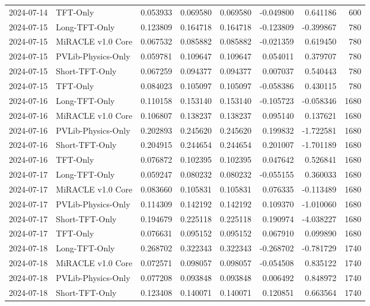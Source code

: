\begin{tabular}{llrrrrrr}
2024-07-14 & TFT-Only & 0.053933 & 0.069580 & 0.069580 & -0.049800 & 0.641186 & 600 \\
2024-07-15 & Long-TFT-Only & 0.123809 & 0.164718 & 0.164718 & -0.123809 & -0.399867 & 780 \\
2024-07-15 & MiRACLE v1.0 Core & 0.067532 & 0.085882 & 0.085882 & -0.021359 & 0.619450 & 780 \\
2024-07-15 & PVLib-Physics-Only & 0.059781 & 0.109647 & 0.109647 & 0.054011 & 0.379707 & 780 \\
2024-07-15 & Short-TFT-Only & 0.067259 & 0.094377 & 0.094377 & 0.007037 & 0.540443 & 780 \\
2024-07-15 & TFT-Only & 0.084023 & 0.105097 & 0.105097 & -0.058386 & 0.430115 & 780 \\
2024-07-16 & Long-TFT-Only & 0.110158 & 0.153140 & 0.153140 & -0.105723 & -0.058346 & 1680 \\
2024-07-16 & MiRACLE v1.0 Core & 0.106807 & 0.138237 & 0.138237 & 0.095140 & 0.137621 & 1680 \\
2024-07-16 & PVLib-Physics-Only & 0.202893 & 0.245620 & 0.245620 & 0.199832 & -1.722581 & 1680 \\
2024-07-16 & Short-TFT-Only & 0.204915 & 0.244654 & 0.244654 & 0.201007 & -1.701189 & 1680 \\
2024-07-16 & TFT-Only & 0.076872 & 0.102395 & 0.102395 & 0.047642 & 0.526841 & 1680 \\
2024-07-17 & Long-TFT-Only & 0.059247 & 0.080232 & 0.080232 & -0.055155 & 0.360033 & 1680 \\
2024-07-17 & MiRACLE v1.0 Core & 0.083660 & 0.105831 & 0.105831 & 0.076335 & -0.113489 & 1680 \\
2024-07-17 & PVLib-Physics-Only & 0.114309 & 0.142192 & 0.142192 & 0.109370 & -1.010060 & 1680 \\
2024-07-17 & Short-TFT-Only & 0.194679 & 0.225118 & 0.225118 & 0.190974 & -4.038227 & 1680 \\
2024-07-17 & TFT-Only & 0.076631 & 0.095152 & 0.095152 & 0.067910 & 0.099890 & 1680 \\
2024-07-18 & Long-TFT-Only & 0.268702 & 0.322343 & 0.322343 & -0.268702 & -0.781729 & 1740 \\
2024-07-18 & MiRACLE v1.0 Core & 0.072571 & 0.098057 & 0.098057 & -0.054508 & 0.835122 & 1740 \\
2024-07-18 & PVLib-Physics-Only & 0.077208 & 0.093848 & 0.093848 & 0.006492 & 0.848972 & 1740 \\
2024-07-18 & Short-TFT-Only & 0.123408 & 0.140071 & 0.140071 & 0.120851 & 0.663564 & 1740 \\

\end{tabular}
